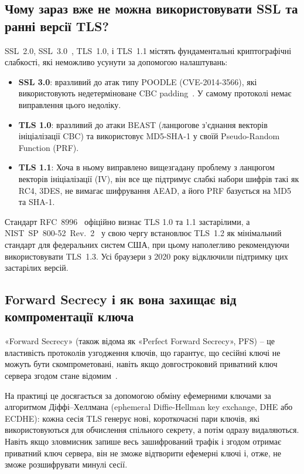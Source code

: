 \subsection{Чому зараз вже не можна використовувати SSL та ранні версії TLS?}

SSL~2.0, SSL~3.0~\cite{rfc6101}, TLS~1.0, і TLS~1.1 містять фундаментальні криптографічні слабкості, які неможливо 
усунути за допомогою налаштувань:

\begin{itemize}
    \item \textbf{SSL 3.0}: вразливий до атак типу POODLE (CVE-2014-3566), які використовують недетерміноване 
        CBC padding~\cite{poodle_paper}. У самому протоколі немає виправлення цього недоліку.
    \item \textbf{TLS 1.0}: вразливий до атаки BEAST (ланцюгове з'єднання векторів ініціалізації CBC) та 
        використовує MD5-SHA-1 у своїй Pseudo-Random Function (PRF).
    \item \textbf{TLS 1.1}: Хоча в ньому виправлено вищезгадану проблему з ланцюгом векторів ініціалізації (IV), 
        він все ще підтримує слабкі набори шифрів такі як RC4, 3DES, не вимагає шифрування AEAD, а його PRF 
        базується на MD5 та SHA-1.
\end{itemize}

Стандарт RFC~8996~\cite{rfc8996} офіційно визнає TLS 1.0 та 1.1 застарілими, а NIST~SP~800-52~Rev.~2~\cite{nist_sp800_52r2} 
у свою чергу встановлює TLS~1.2 як мінімальний стандарт для федеральних систем США, при цьому наполегливо 
рекомендуючи використовувати TLS~1.3. Усі браузери з 2020 року відключили підтримку цих застарілих версій.

\subsection{Forward Secrecy і як вона захищає від компроментації ключа}

«Forward Secrecy» (також відома як «Perfect Forward Secrecy», PFS) -- це властивість протоколів узгодження 
ключів, що гарантує, що сесійні ключі не можуть бути скомпрометовані, навіть якщо довгостроковий приватний 
ключ сервера згодом стане відомим~\cite{cloudflare_forward_secrecy}.

На практиці це досягається за допомогою обміну ефемерними ключами за алгоритмом Діффі–Хеллмана 
(ephemeral Diffie-Hellman key exchange, DHE або ECDHE): кожна сесія TLS генерує нові, короткочасні пари ключів, які 
використовуються для обчислення спільного секрету, а потім одразу видаляються. Навіть якщо зловмисник запише весь 
зашифрований трафік і згодом отримає приватний ключ сервера, він не зможе відтворити ефемерні ключі і, отже, 
не зможе розшифрувати минулі сесії.

